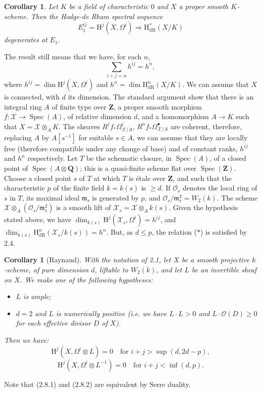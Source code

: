 \documentclass[10pt,reqno]{article}
\newcommand{\mbold}{\mathbf}
\newcommand{\dR}{\mathrm{dR}}
\renewcommand{\H}{\mathrm{H}}
\renewcommand{\O}{\mathcal{O}}
\newcommand{\ah}{^\ast}
\newcommand{\al}{_\ast}
\newcommand{\bh}{^\bullet}
\DeclareMathOperator{\Spec}{Spec}
\theoremstyle{plain}
\newtheorem{coro}[thm]{Corollary}
\theoremstyle{definition}
\begin{document}
\begin{coro}
Let $K$ be a field of characteristic $0$ and $X$ a proper smooth $K$-scheme. Then the Hodge-de Rham spectral sequence
\[
  E_1^{ij}=\H^j(X,\Omega^i)\Longrightarrow\H_\dR\ah(X/K)\tag{2.7.1}
\]
degenerates at $E_1$.
\end{coro}
The result still means that we have, for each $n$,
\[
  \sum_{i+j=n}h^{ij}=h^n,\tag{$\ast$}
\]
where $h^{ij}=\dim\H^j(X,\Omega^i)$ and $h^n=\dim\H_\dR^n(X/K)$. We can assume that $X$ is connected,
with $d$ its dimension. The standard argument show that there is an integral ring $A$ of finite type over
$\mbold{Z}$, a proper smooth morphism $f:\mathcal{X}\to\Spec(A)$, of relative dimension $d$, and a homomorphism
$A\to K$ such that $X=\mathcal{X}\otimes_A K$. The sheaves $R^j f\al\Omega_{\mathcal{X}/A}^i$,
$R^n f\al\Omega_{\mathcal{X}/A}\bh$ are coherent, therefore, replacing $A$ by $A[s^{-1}]$ for suitable
$s\in A$, we can assume that they are locally free (therefore compatible under any change of base)
and of constant ranks, $h^{ij}$ and $h^n$ respectively. Let $T$ be the schematic closure, in $\Spec(A)$,
of a closed point of $\Spec(A\otimes\mbold{Q})$; this is a quasi-finite scheme flat over $\Spec(\mbold{Z})$.
Choose a closed point $s$ of $T$ at which $T$ is {\'e}tale over $\mbold{Z}$, and such that the characteristic
$p$ of the finite field $k=k(s)$ is $\geq d$. If $\O_s$ denotes the local ring of $s$ in $T$, its maximal ideal
$\mathfrak{m}_s$ is generated by $p$, and $\O_s/\mathfrak{m}_s^2=W_2(k)$. The scheme
$\mathcal{X}\otimes_A(\O_s/\mathfrak{m}_s^2)$ is a smooth lift of $\mathcal{X}_s=\mathcal{X}\otimes_A k(s)$.
Given the hypothesis stated above, we have $\dim_{k(s)}\H^j(\mathcal{X}_s,\Omega^i)=h^{ij}$, and
$\dim_{k(s)}\H_\dR^n(\mathcal{X}_s/k(s))=h^n$. But, as $d\leq p$, the relation ($\ast$) is satisfied by 2.4.

\begin{coro}[Raynaud]
With the notation of 2.1, let $X$ be a smooth projective $k$-scheme, of pure dimension $d$, liftable to
$W_2(k)$, and let $L$ be an invertible sheaf on $X$. We make one of the following hypotheses:
\begin{itemize}
  \item[\emph{(i)}] $L$ is ample;
  \item[\emph{(ii)}] $d=2$ and $L$ is numerically positive (i.e. we have $L\cdot L>0$ and $L\cdot\O(D)\geq 0$ for
              each effective divisor $D$ of $X$).
\end{itemize}
Then we have:
\[
  \H^j(X,\Omega^i\otimes L)=0\quad\text{for }i+j>\sup(d,2d-p),\tag{2.8.1}
\]
\[
  \H^j(X,\Omega^i\otimes L^{-1})=0\quad\text{for }i+j<\inf(d,p).\tag{2.8.2}
\]
\end{coro}
\noindent
Note that (2.8.1) and (2.8.2) are equivalent by Serre duality.
\end{document}
